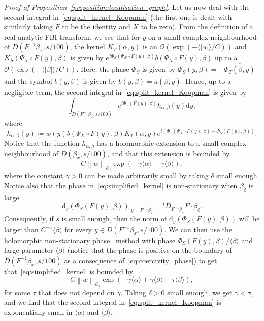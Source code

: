 \documentclass[AHL,Unicode,longabstracts,published]{cedram}
\newcommand{\p}[1]{\left(#1\right)}
\newcommand{\n}[1]{\left\|#1\right\|}
\newcommand{\va}[1]{\left|#1\right|}
\newcommand{\brac}[1]{\langle #1 \rangle}
\newcommand{\clO}{\mathcal{O}}
\newcommand{\rmd}{\mathrm{d}}
\newcommand{\clO}{\mathcal{O}}
\begin{document}
\begin{proof}[Proof of Proposition~\ref{proposition:localisation_graph}]
Let us now deal with the second integral in~\eqref{eq:split_kernel_Koopman} (the first one is dealt with similarly taking $F$ to be the identity and $X$ to be zero). From the definition of a real-analytic FBI transform, we see that for $y$ on a small complex neighbourhood of $D(F^{-1} \beta_x,s/100)$, the kernel $K_T(\alpha,y)$ is an $\clO\p{\exp\p{- \brac{\va{\alpha}}/C}}$ and $K_S(\Psi_X \circ F(y),\beta)$ is given by $e^{i \Phi_S(\Psi_X \circ F(y),\beta)} b(\Psi_X \circ F(y),\beta)$ up to a $\clO\p{\exp\p{- \brac{\va{\beta}}/C}}$. Here, the phase $\Phi_S$ is given by $\Phi_S(y,\beta) = - \overline{\Phi_T(\bar{\beta},\bar{y})}$ and the symbol $b(y,\beta)$ is given by $b(y,\beta) = \overline{a(\bar{\beta},\bar{y})}$. Hence, up to a negligible term, the second integral in~\eqref{eq:split_kernel_Koopman} is given by
\begin{equation}\label{eq:simplified_kernel}
\int_{D\left(F^{-1} \beta_x,s/100\right)} e^{i \Phi_S(F (y),\beta)} h_{\alpha,\beta}(y) \rmd y,
\end{equation}
where
\begin{equation*}
h_{\alpha,\beta}(y) \coloneqq w(y) b(\Psi_X \circ F(y),\beta) K_T(\alpha,y) e^{i \left(\Phi_S(\Psi_X \circ F (y),\beta) - \Phi_S(F(y),\beta)\right)}.
\end{equation*}
Notice that the function $h_{\alpha,\beta}$ has a holomorphic extension to a small complex neighbourhood of $D(\beta_x,s/100)$, and that this extension is bounded by
\begin{equation*}
C \n{w}_{\clO_\epsilon} \exp\p{ - \gamma \brac{\alpha} + \gamma \brac{\beta} },
\end{equation*}
where the constant $\gamma > 0$ can be made arbitrarily small by taking $\delta$ small enough. Notice also that the phase in~\eqref{eq:simplified_kernel} is non-stationary when $\beta_\xi$ is large:
\begin{equation*}
\rmd _y\p{\Phi_S (F(y),\beta)}_{| y = F^{-1} \beta_x} = {}^t D_{F^{-1} \beta_x} F \cdot \beta_\xi.
\end{equation*}
Consequently, if $s$ is small enough, then the norm of $\rmd _y\p{\Phi_S (F(y),\beta)}$ will be larger than $C^{-1} \brac{\beta}$ for every $y \in D(F^{-1} \beta_x,s/100)$. We can then use the holomorphic non-stationary phase~\cite[Proposition~1.1]{BJ20} method with phase $\Phi_S(F(y),\beta)/ \brac{\beta}$ and large parameter $\brac{\beta}$ (notice that the phase is positive on the boundary of $D(F^{-1} \beta_x,s/100)$ as a consequence of~\eqref{eq:coercivity_phase}) to get that~\eqref{eq:simplified_kernel} is bounded by
\begin{equation*}
C \n{w}_{\clO_\epsilon} \exp\p{ - \gamma \brac{\alpha} + \gamma \brac{\beta} - \tau \brac{\beta}},
\end{equation*}
for some $\tau$ that does not depend on $\gamma$. Taking $\delta > 0$ small enough, we get $\gamma < \tau$, and we find that the second integral in~\eqref{eq:split_kernel_Koopman} is exponentially small in $\brac{\alpha}$ and $\brac{\beta}$.


\end{proof}
\end{document}
